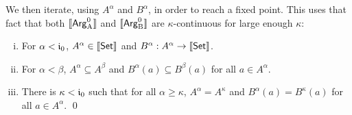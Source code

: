 \documentclass{article}
\begin{document}
  We then iterate, using $A^{\alpha}$ and $B^{\alpha}$, in order to
  reach a fixed point. This uses that fact that both $\llbracket \mathsf{Arg}^{0}_{\mathrm{A}} \rrbracket$
  and $\llbracket \mathsf{Arg}^{0}_{\mathrm{B}} \rrbracket$ are $\kappa$-continuous for large enough
  $\kappa$:

\begin{lemma} \mbox{}
\label{thm:A-in-Set}
  \begin{enumerate}[(i)]
  \item For $\alpha < \mathfrak{i}_0$, $A^{\alpha} \in \llbracket \mathsf{Set} \rrbracket$ and $B^{\alpha} :
    A^{\alpha} \to \llbracket \mathsf{Set} \rrbracket$. 
  \item For $\alpha < \beta$, $A^{\alpha} \subseteq A^{\beta}$ and  $B^{\alpha}(a) \subseteq
    B^{\beta}(a)$ for all $a \in A^{\alpha}$. 
  \item There is $\kappa < \mathfrak{i}_0$ such that for  all $\alpha \geq \kappa$,
    $A^{\alpha} = A^{\kappa}$ and $B^{\alpha}(a) =  B^{\kappa}(a)$ for all $a
    \in A^{\alpha}$. \qed 
  \end{enumerate}
\end{lemma}

\end{document}
